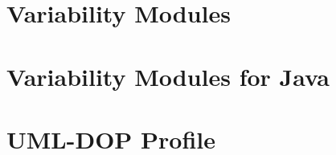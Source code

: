 \author{Hafiyyan Sayyid Fadhlillah}



\author{Maya Retno Ayu Setyautami}


\section{Variability Modules}


\section{Variability Modules for Java}


\section{UML-DOP Profile}



